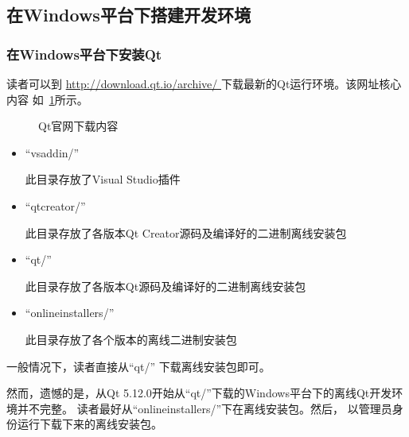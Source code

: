 ﻿




%

\FloatBarrier
\subsection{
在Windows平台下搭建开发环境
}\label{s000110}


\FloatBarrier
\subsubsection{
在Windows平台下安装Qt
}\label{ss000110}


读者可以到 \url{http://download.qt.io/archive/
}
下载最新的Qt运行环境。该网址核心内容
如\figurename\ \ref{p000000a}所示。

\begin{figure}[htb] %
\marginnote{\setlength\fboxsep{2pt}\fbox{\footnotesize{\kaishu\figurename\,}\footnotesize{\ref{p000000a}}}}\centering %
\setlength\fboxsep{0pt} %
\caption{Qt官网下载内容} %
\label{p000000a} %
\end{figure}


\begin{itemize}
\item “vsaddin/” 

此目录存放了Visual Studio插件
\item “qtcreator/” 

此目录存放了各版本Qt Creator源码及编译好的二进制离线安装包
\item “qt/” 

此目录存放了各版本Qt源码及编译好的二进制离线安装包
\item “online\underline{\hspace{0.5em}}installers/”

此目录存放了各个版本的离线二进制安装包
\end{itemize}

一般情况下，读者直接从“qt/” 下载离线安装包即可。

然而，遗憾的是，从Qt 5.12.0开始从“qt/”下载的Windows平台下的离线Qt开发环境并不完整。
读者最好从“online\underline{\hspace{0.5em}}installers/”下在离线安装包。然后，
以管理员身份运行下载下来的离线安装包。

